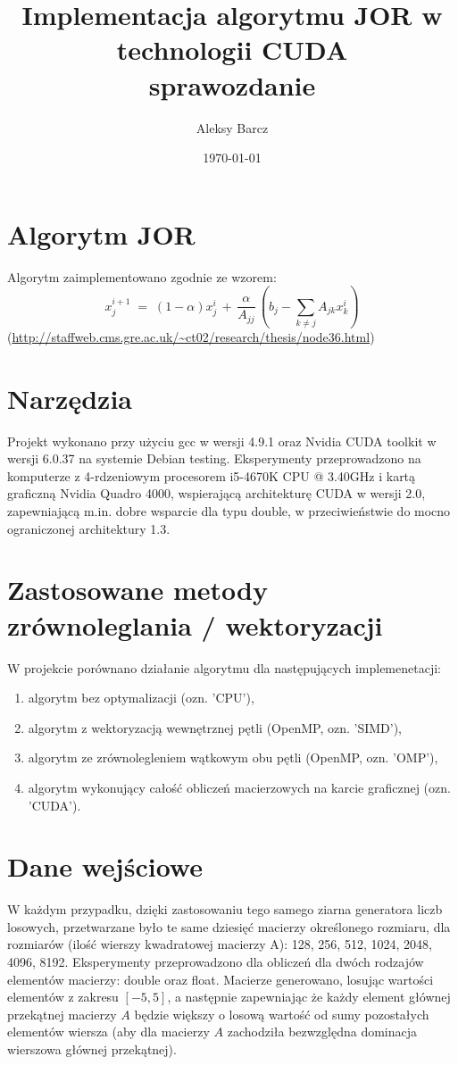 \documentclass[11pt,a4paper]{article}
\date {\today}
\author {Aleksy Barcz}
\title{Implementacja algorytmu JOR w technologii CUDA\\sprawozdanie}
\begin{document}
\maketitle

\section{Algorytm JOR}
Algorytm zaimplementowano zgodnie ze wzorem:
\begin{equation}
x_j^{i+1} \; = \; (1-\alpha) x_j^i \, + \, \frac{\alpha}
{A_{jj}} \, \left(b_j - \sum_{k\not=j} A_{jk}
x_k^i\right)
\end{equation}
(\url{http://staffweb.cms.gre.ac.uk/~ct02/research/thesis/node36.html})\\

\section{Narzędzia}
Projekt wykonano przy użyciu gcc w wersji 4.9.1 oraz Nvidia CUDA toolkit w wersji 6.0.37 na systemie Debian testing. Eksperymenty przeprowadzono na komputerze z 4-rdzeniowym procesorem i5-4670K CPU @ 3.40GHz i kartą graficzną Nvidia Quadro 4000, wspierającą architekturę CUDA w wersji 2.0, zapewniającą m.in. dobre wsparcie dla typu double, w przeciwieństwie do mocno ograniczonej architektury 1.3.

\section{Zastosowane metody zrównoleglania / wektoryzacji}
W projekcie porównano działanie algorytmu dla następujących implemenetacji:
\begin{enumerate}
	\item algorytm bez optymalizacji (ozn. 'CPU'),
	\item algorytm z wektoryzacją wewnętrznej pętli (OpenMP, ozn. 'SIMD'),
	\item algorytm ze zrównolegleniem wątkowym obu pętli (OpenMP, ozn. 'OMP'),
	\item algorytm wykonujący całość obliczeń macierzowych na karcie graficznej (ozn. 'CUDA').
\end{enumerate}

\section{Dane wejściowe}
W każdym przypadku, dzięki zastosowaniu tego samego ziarna generatora liczb losowych, przetwarzane było te same dziesięć macierzy określonego rozmiaru, dla rozmiarów (ilość wierszy kwadratowej macierzy A): 128, 256, 512, 1024, 2048, 4096, 8192. Eksperymenty przeprowadzono dla obliczeń dla dwóch rodzajów elementów macierzy: double oraz float. Macierze generowano, losując wartości elementów z zakresu $[-5, 5]$, a następnie zapewniając że każdy element głównej przekątnej macierzy $A$ będzie większy o losową wartość od sumy pozostałych elementów wiersza (aby dla macierzy $A$ zachodziła bezwzględna dominacja wierszowa głównej przekątnej).
\end{document}
